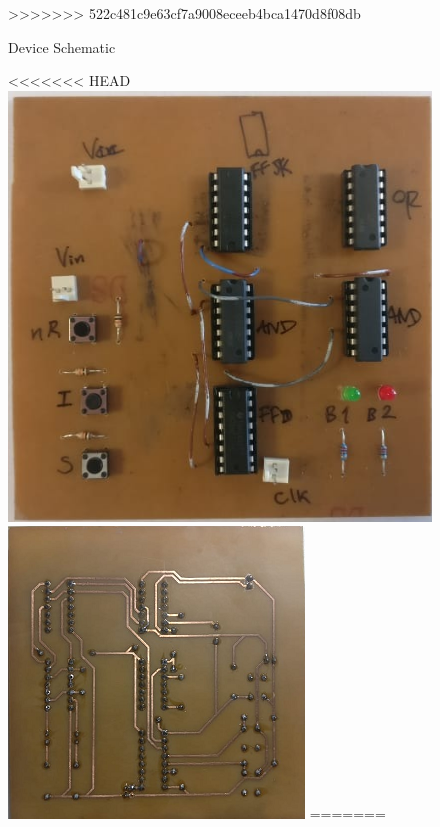 \begin{figure}[H]
\begin{center}
>>>>>>> 522c481c9e63cf7a9008eceeb4bca1470d8f08db
        \caption{Device Schematic}
        \label{fig:moore_schem}
    \end{center}
\end{figure}

\begin{figure}[H]
    \begin{center}
<<<<<<< HEAD
        \includegraphics[scale=0.3]{../Exercise1/Moore/report/final_build.png}
        \includegraphics[scale=0.3]{../Exercise1/Moore/report/final_back.png}
=======

\end{center}
\end{figure}
